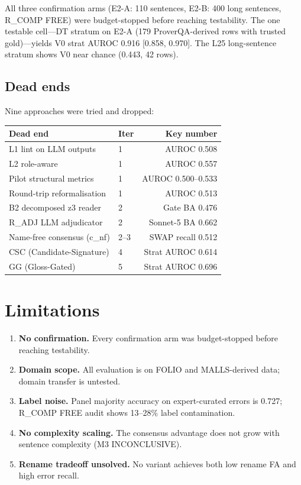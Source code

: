\documentclass[11pt,letterpaper]{article}
\begin{document}
All three confirmation arms (E2-A: 110 sentences, E2-B: 400 long sentences, R\_COMP FREE) were budget-stopped before reaching testability. The one testable cell---DT stratum on E2-A (179 ProverQA-derived rows with trusted gold)---yields V0 strat AUROC 0.916 [0.858, 0.970]. The L25 long-sentence stratum shows V0 near chance (0.443, 42 rows).

\subsection{Dead ends}

Nine approaches were tried and dropped:

\begin{center}
\small
\begin{tabular}{llr}
\toprule
Dead end & Iter & Key number \\
\midrule
L1 lint on LLM outputs & 1 & AUROC 0.508 \\
L2 role-aware & 1 & AUROC 0.557 \\
Pilot structural metrics & 1 & AUROC 0.500--0.533 \\
Round-trip reformalisation & 1 & AUROC 0.513 \\
B2 decomposed z3 reader & 2 & Gate BA 0.476 \\
R\_ADJ LLM adjudicator & 2 & Sonnet-5 BA 0.662 \\
Name-free consensus (c\_nf) & 2--3 & SWAP recall 0.512 \\
CSC (Candidate-Signature) & 4 & Strat AUROC 0.614 \\
GG (Gloss-Gated) & 5 & Strat AUROC 0.696 \\
\bottomrule
\end{tabular}
\end{center}

\section{Limitations}

\begin{enumerate}[nosep]
\item \textbf{No confirmation.} Every confirmation arm was budget-stopped before reaching testability.
\item \textbf{Domain scope.} All evaluation is on FOLIO and MALLS-derived data; domain transfer is untested.
\item \textbf{Label noise.} Panel majority accuracy on expert-curated errors is 0.727; R\_COMP FREE audit shows 13--28\% label contamination.
\item \textbf{No complexity scaling.} The consensus advantage does not grow with sentence complexity (M3 INCONCLUSIVE).
\item \textbf{Rename tradeoff unsolved.} No variant achieves both low rename FA and high error recall.
\end{enumerate}
\end{document}
